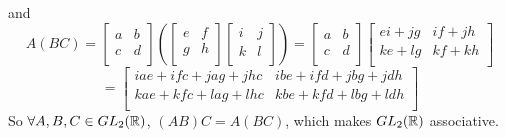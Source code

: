 \documentclass[12pt]{article}
\begin{document}
    and 
    \[ A(BC) =
    \begin{bmatrix}
    a & b \\
    c & d \\
    \end{bmatrix}
    \left( \begin{bmatrix}
    e & f \\
    g & h \\
    \end{bmatrix}
    \begin{bmatrix}
    i & j \\
    k & l \\
    \end{bmatrix} \right)
    = \begin{bmatrix}
    a & b \\
    c & d \\
    \end{bmatrix}
    \begin{bmatrix}
    ei + jg & if + jh \\
    ke + lg & kf + kh \\
    \end{bmatrix} \]
    \[ = \begin{bmatrix}
    iae + ifc + jag + jhc & ibe + ifd + jbg + jdh \\
    kae + kfc + lag + lhc & kbe + kfd + lbg + ldh \\
    \end{bmatrix} \]
    So $\forall A, B, C \in GL_2(\mathbb{R})$, $(AB)C = A(BC)$,
    which makes $GL_2(\mathbb{R})$ associative.
\end{document}

